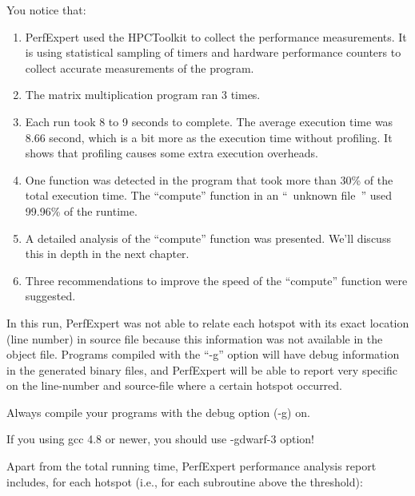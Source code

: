 You notice that:

\begin{enumerate}
  \item  PerfExpert used the HPCToolkit to collect the performance measurements. It is using statistical sampling of timers and hardware performance counters to collect accurate measurements of the program.
  \item  The matrix multiplication program ran 3 times.
  \item  Each run took 8 to 9 seconds to complete. The average execution time was 8.66 second, which is a bit more as the execution time without profiling. It shows that profiling causes some extra execution overheads.
  \item  One function was detected in the program that took more than 30\% of the total execution time. The ``compute'' function in an ``~unknown file~'' used 99.96\% of the runtime.
  \item  A detailed analysis of the ``compute'' function was presented. We'll discuss this in depth in the next chapter.
  \item  Three recommendations to improve the speed of the ``compute'' function were suggested.
\end{enumerate}

In this run, PerfExpert was not able to relate each hotspot with its exact location (line number) in source file because this information was not available in the object file. Programs compiled with the ``-g'' option will have debug information in the generated binary files, and PerfExpert will be able to report very specific on the line-number and source-file where a certain hotspot occurred.

\begin{tip}
Always compile your programs with the debug option (-g) on.
\end{tip}

\begin{tip}
If you using gcc 4.8 or newer, you should use -gdwarf-3 option!
\end{tip}


Apart from the total running time, PerfExpert performance analysis report includes, for each hotspot (i.e., for each subroutine above the threshold):


